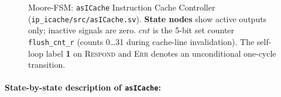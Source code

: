 \begin{figure}[H]
\caption{Moore-FSM: \texttt{asICache} Instruction Cache Controller
  (\texttt{ip\_icache/src/asICache.sv}).
  \textbf{State nodes} show active outputs only; inactive signals are
  zero.
  $\mathit{cnt}$ is the 5-bit set counter \texttt{flush\_cnt\_r}
  (counts 0\ldots{}31 during cache-line invalidation).
  The self-loop label \textbf{1} on \textsc{Respond} and \textsc{Err}
  denotes an unconditional one-cycle transition.}
\label{fig:asICacheFsm01}
\end{figure}

\paragraph{State-by-state description of \texttt{asICache}:}


